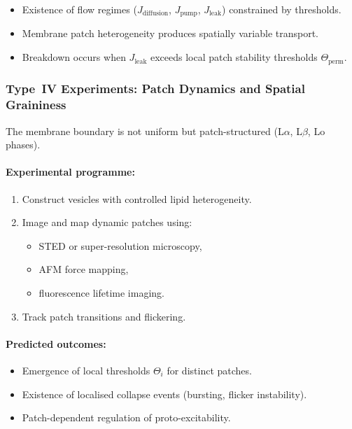 \begin{itemize}
    \item Existence of flow regimes ($J_{\mathrm{diffusion}}$, 
          $J_{\mathrm{pump}}$, $J_{\mathrm{leak}}$) constrained by thresholds.
    \item Membrane patch heterogeneity produces spatially variable transport.
    \item Breakdown occurs when 
          $J_{\mathrm{leak}}$ exceeds local patch stability thresholds 
          $\Theta_{\mathrm{perm}}$.
\end{itemize}



\subsubsection{Type~IV Experiments: Patch Dynamics and Spatial Graininess}

The membrane boundary is not uniform but patch-structured (L$\alpha$, L$\beta$, 
Lo phases).

\paragraph{Experimental programme:}

\begin{enumerate}
    \item Construct vesicles with controlled lipid heterogeneity.
    \item Image and map dynamic patches using:
          \begin{itemize}
              \item STED or super-resolution microscopy,
              \item AFM force mapping,
              \item fluorescence lifetime imaging.
          \end{itemize}
    \item Track patch transitions and flickering.
\end{enumerate}

\paragraph{Predicted outcomes:}

\begin{itemize}
    \item Emergence of local thresholds $\Theta_i$ for distinct patches.
    \item Existence of localised collapse events (bursting, flicker instability).
    \item Patch-dependent regulation of proto-excitability.
\end{itemize}



